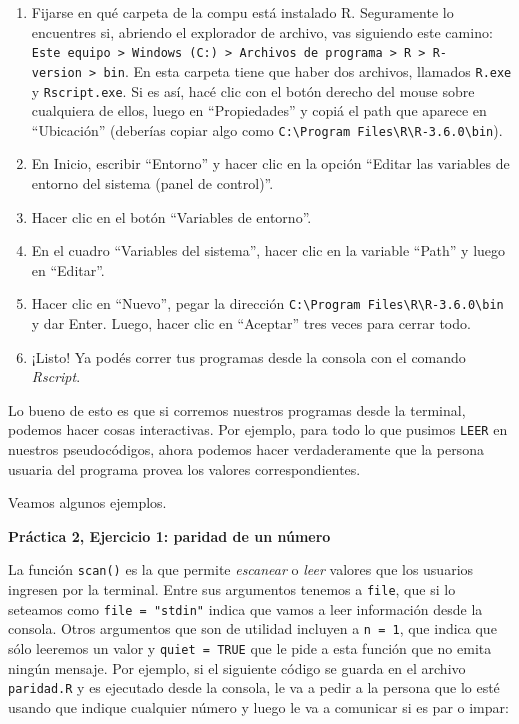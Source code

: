\documentclass[
]{book}
\providecommand{\tightlist}{%
  \setlength{\itemsep}{0pt}\setlength{\parskip}{0pt}}
\begin{document}
\begin{enumerate}
\def\labelenumi{\arabic{enumi}.}
\tightlist
\item
  Fijarse en qué carpeta de la compu está instalado R. Seguramente lo encuentres si, abriendo el explorador de archivo, vas siguiendo este camino: \texttt{Este\ equipo\ \textgreater{}\ Windows\ (C:)\ \textgreater{}\ Archivos\ de\ programa\ \textgreater{}\ R\ \textgreater{}\ R-version\ \textgreater{}\ bin}. En esta carpeta tiene que haber dos archivos, llamados \texttt{R.exe} y \texttt{Rscript.exe}. Si es así, hacé clic con el botón derecho del mouse sobre cualquiera de ellos, luego en ``Propiedades'' y copiá el path que aparece en ``Ubicación'' (deberías copiar algo como \texttt{C:\textbackslash{}Program\ Files\textbackslash{}R\textbackslash{}R-3.6.0\textbackslash{}bin}).
\item
  En Inicio, escribir ``Entorno'' y hacer clic en la opción ``Editar las variables de entorno del sistema (panel de control)''.
\item
  Hacer clic en el botón ``Variables de entorno''.
\item
  En el cuadro ``Variables del sistema'', hacer clic en la variable ``Path'' y luego en ``Editar''.
\item
  Hacer clic en ``Nuevo'', pegar la dirección \texttt{C:\textbackslash{}Program\ Files\textbackslash{}R\textbackslash{}R-3.6.0\textbackslash{}bin} y dar Enter. Luego, hacer clic en ``Aceptar'' tres veces para cerrar todo.
\item
  ¡Listo! Ya podés correr tus programas desde la consola con el comando \emph{Rscript}.
\end{enumerate}

Lo bueno de esto es que si corremos nuestros programas desde la terminal, podemos hacer cosas interactivas. Por ejemplo, para todo lo que pusimos \texttt{LEER} en nuestros pseudocódigos, ahora podemos hacer verdaderamente que la persona usuaria del programa provea los valores correspondientes.

Veamos algunos ejemplos.

\textbf{Práctica 2, Ejercicio 1: paridad de un número}

La función \texttt{scan()} es la que permite \emph{escanear} o \emph{leer} valores que los usuarios ingresen por la terminal. Entre sus argumentos tenemos a \texttt{file}, que si lo seteamos como \texttt{file\ =\ "stdin"} indica que vamos a leer información desde la consola. Otros argumentos que son de utilidad incluyen a \texttt{n\ =\ 1}, que indica que sólo leeremos un valor y \texttt{quiet\ =\ TRUE} que le pide a esta función que no emita ningún mensaje. Por ejemplo, si el siguiente código se guarda en el archivo \texttt{paridad.R} y es ejecutado desde la consola, le va a pedir a la persona que lo esté usando que indique cualquier número y luego le va a comunicar si es par o impar:
\end{document}
